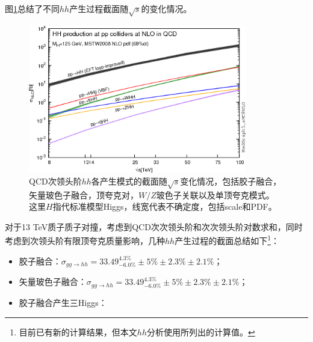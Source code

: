 图\ref{fig:diagram_SMhh_VBF}总结了不同$hh$产生过程截面随$\sqrt{s}$的变化情况。
\begin{figure}[h]
\centering
 \includegraphics[width=0.85\textwidth]{fig/HH-xsec.png}
\caption{QCD次领头阶$hh$各产生模式的截面随$\sqrt{s}$变化情况\cite{Frederix:2014hta}，包括胶子融合，矢量玻色子融合，顶夸克对，$W/Z$玻色子关联以及单顶夸克模式。
这里$H$指代标准模型Higgs，线宽代表不确定度，包括scale和PDF。}
\label{fig:diagram_SMhh_VBF}
\end{figure}
对于13 TeV质子质子对撞，考虑到QCD次次领头阶和次次领头阶对数求和，同时考虑到次领头阶有限顶夸克质量影响，几种$hh$产生过程的截面\cite{deFlorian:2016spz}总结如下\footnote{目前已有新的计算结果\cite{Grazzini:2018bsd,deFlorian:2013jea}，但本文$hh$分析使用所列出的计算值。}：
\begin{itemize}
 \item 胶子融合：$\sigma_{gg\rightarrow hh}=33.49^{4.3\%}_{-6.0\%}\pm5\%\pm2.3\%\pm2.1\%$；
 \item 矢量玻色子融合：$\sigma_{gg\rightarrow hh}=33.49^{4.3\%}_{-6.0\%}\pm5\%\pm2.3\%\pm2.1\%$；
 \item 胶子融合产生三Higgs：
\end{itemize}

